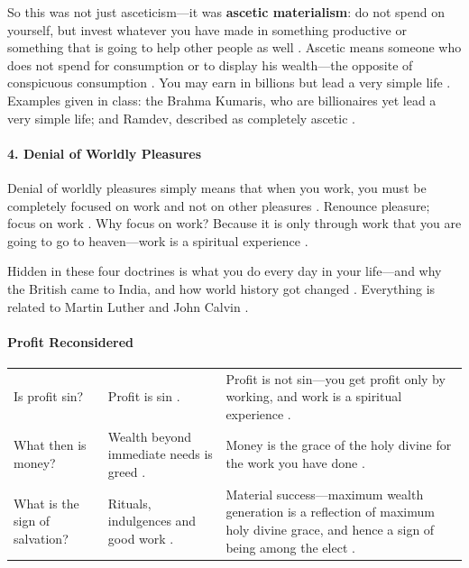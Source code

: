 So this was not just asceticism---it was \textbf{ascetic materialism}: do not spend on yourself, but invest whatever you have made in something productive or something that is going to help other people as well .
Ascetic means someone who does not spend for consumption or to display his wealth---the opposite of conspicuous consumption . You may earn in billions but lead a very simple life .
Examples given in class: the Brahma Kumaris, who are billionaires yet lead a very simple life; and Ramdev, described as completely ascetic .

\paragraph{4. Denial of Worldly Pleasures}
Denial of worldly pleasures simply means that when you work, you must be completely focused on work and not on other pleasures . Renounce pleasure; focus on work .
Why focus on work? Because it is only through work that you are going to go to heaven---work is a spiritual experience .

\begin{KeyConcept}
Hidden in these four doctrines is what you do every day in your life---and why the British came to India, and how world history got changed . Everything is related to Martin Luther and John Calvin .
\end{KeyConcept}

\paragraph{Profit Reconsidered}
\vspace{6pt}
\noindent
\begin{tabularx}{\textwidth}{>{\hsize}Y >{\hsize}Y >{\hsize}Y}
\toprule
{}
 &  &  \\
\midrule
Is profit sin? & Profit is sin . & Profit is not sin---you get profit only by working, and work is a spiritual experience . \\
\midrule
What then is money? & Wealth beyond immediate needs is greed . & Money is the grace of the holy divine for the work you have done . \\
\midrule
What is the sign of salvation? & Rituals, indulgences and good work . & Material success---maximum wealth generation is a reflection of maximum holy divine grace, and hence a sign of being among the elect . \\
\bottomrule
\end{tabularx}
\vspace{6pt}

